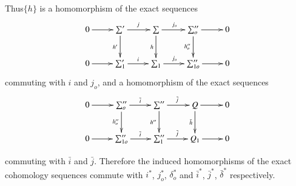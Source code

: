 Thus\pageoriginale $\{ h\}$ is a homomorphism of the exact sequences
\[
\xymatrix{
0\ar[r] & \sum' \ar[r]^{j} \ar[d]_{h'} & \sum \ar[r]^{j_o}\ar[d]_h &
\sum''_o \ar[r] \ar[d]_{h''_o} & 0\\
0 \ar[r] & \sum'_1 \ar[r]^i & \sum_1 \ar[r]^{j_o} & \sum''_{1o} \ar[r]
& 0
}
\]
\noindent
commuting with $i$ and $j_o$, and a homomorphism of the exact sequences
\[
\xymatrix{
0 \ar[r] & \sum''_o \ar[r]^{\bar{i}}\ar[d]_{h''_o} &
\sum''\ar[r]^{\bar{j}}\ar[d]_{h''} & Q \ar[d]_{\bar{h}} \ar[r] & 0\\
0 \ar[r] & \sum''_{1o} \ar[r]^{\bar{i}} & \sum''_1 \ar[r]^{\bar{j}} &
Q_1 \ar[r] & 0
}
\]

\noindent
commuting with $\bar{i}$ and $\bar{j}$. Therefore the induced
homomorphisms of the exact cohomology sequences commute with $i^*$, $j^*_o$,
$\delta ^*_o$ and $\bar{i}^*$, $\bar{j}^*$, $\bar{\delta}^*$ respectively. 

